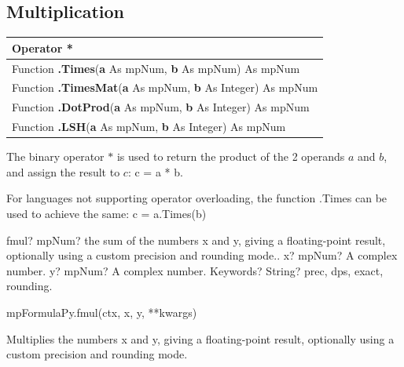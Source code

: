 \subsection{Multiplication}
\begin{tabular}{p{481pt}}
	\toprule
	\textsf{Operator \textbf{*}}\index{Multiprecision Functions!*} \\
	\midrule
	\textsf{Function \textbf{.Times}(\textbf{a} As mpNum, \textbf{b} As mpNum) As mpNum}\index{Multiprecision Functions!.Times} \\
	
	\textsf{Function \textbf{.TimesMat}(\textbf{a} As mpNum, \textbf{b} As Integer) As mpNum}\index{Multiprecision Functions!.TimesMat} \\
	\textsf{Function \textbf{.DotProd}(\textbf{a} As mpNum, \textbf{b} As Integer) As mpNum}\index{Multiprecision Functions!.DotProd} \\
	\textsf{Function \textbf{.LSH}(\textbf{a} As mpNum, \textbf{b} As Integer) As mpNum}\index{Multiprecision Functions!.LSH} \\
	
	\bottomrule
\end{tabular}

\vspace{0.3cm}
The binary operator $*$ is used to return the product of the 2 operands $a$ and $b$, and assign the result to $c$: \textsf{c = a * b}.

For languages not supporting operator overloading, the function \textsf{.Times} can be used to achieve the same: \textsf{c = a.Times(b)}







\vspace{0.3cm}
\begin{mpFunctionsExtract}
	\mpFunctionThree
	{fmul? mpNum? the sum of the numbers x and y, giving a floating-point result, optionally using a custom precision and rounding mode..}
	{x? mpNum? A complex number.}
	{y? mpNum? A complex number.}
	{Keywords? String? prec, dps, exact, rounding.}	
\end{mpFunctionsExtract}


mpFormulaPy.fmul(ctx, x, y, **kwargs)

\vpara
Multiplies the numbers x and y, giving a floating-point result, optionally using a custom precision and rounding mode.


